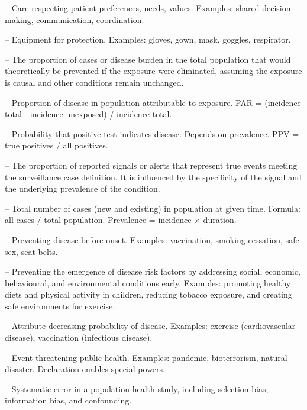 -- Care respecting patient preferences, needs, values. Examples: shared decision-making, communication, coordination.

-- Equipment for protection. Examples: gloves, gown, mask, goggles, respirator.

-- The proportion of cases or disease burden in the total population that would theoretically be prevented if the exposure were eliminated, assuming the exposure is causal and other conditions remain unchanged.

-- Proportion of disease in population attributable to exposure. PAR = (incidence total - incidence unexposed) / incidence total.

-- Probability that positive test indicates disease. Depends on prevalence. PPV = true positives / all positives.


-- The proportion of reported signals or alerts that represent true events meeting the surveillance case definition. It is influenced by the specificity of the signal and the underlying prevalence of the condition.

-- Total number of cases (new and existing) in population at given time. Formula: all cases / total population. Prevalence = incidence × duration.

-- Preventing disease before onset. Examples: vaccination, smoking cessation, safe sex, seat belts.



-- Preventing the emergence of disease risk factors by addressing social, economic, behavioural, and environmental conditions early. Examples: promoting healthy diets and physical activity in children, reducing tobacco exposure, and creating safe environments for exercise.

-- Attribute decreasing probability of disease. Examples: exercise (cardiovascular disease), vaccination (infectious disease).



-- Event threatening public health. Examples: pandemic, bioterrorism, natural disaster. Declaration enables special powers.

-- Systematic error in a population-health study, including selection bias, information bias, and confounding.

